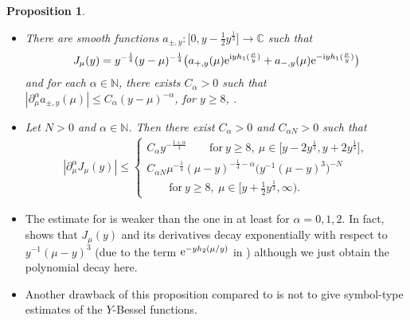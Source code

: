 \documentclass[pdftex]{sigma}
\numberwithin{equation}{section}
\newtheorem{Proposition}[Theorem]{Proposition}
 { \theoremstyle{definition}
\newtheorem{Definition}[Theorem]{Definition}
\newtheorem{Note}[Theorem]{Note}
\newtheorem{Example}[Theorem]{Example}
\newtheorem{Remark}[Theorem]{Remark} }
\def\a{\alpha}
\def\m{\mu}
\def\pa{\partial}
\begin{document}
\begin{Proposition}\label{Besselasymp}\quad
\begin{itemize}\itemsep=0pt
\item[$(i)$] There are smooth functions $a_{\pm,y}\colon \bigl[0,y-\frac{1}{2}y^{\frac{1}{3}}\bigr]\to \mathbb{C}$ such that
\begin{align*}
J_{\m}(y)=y^{-\frac{1}{4}}(y-\m)^{-\frac{1}{4}}\bigl(a_{+,y}(\m){\rm e}^{{\rm i}yh_1(\frac{\m}{y})}+a_{-,y}(\m){\rm e}^{-{\rm i}yh_1(\frac{\m}{y})} \bigr)
\end{align*}
and for each $\a\in\mathbb{N}$, there exists $C_{\a}>0$ such that
$
|\pa_{\m}^{\a}a_{\pm,y}(\m)|\leq C_{\a}(y-\m)^{-\a}$, for $ y\geq 8$, \smash{$ \m\in \bigl[0,y-\frac{1}{2}y^{\frac{1}{3}}\bigr]$}.
\item[$(ii)$] Let $N>0$ and $\a\in\mathbb{N}$. Then there exist $C_{\a}>0$ and $C_{\a N}>0$ such that
\begin{align*}
|\pa_{\m}^{\a}J_{\m}(y)|\leq \begin{cases}C_{\a}y^{-\frac{1+\a}{3}} \qquad \text{for}\  y\geq 8,\  \m\in \bigl[y-2y^{\frac{1}{3}},y+2y^{\frac{1}{3}}\bigr],\\
C_{\a N}\m^{-\frac{1}{4}}(\m-y)^{-\frac{1}{4}-\a} \bigl(y^{-1}(\m-y)^3 \bigr)^{-N} \\
\qquad \text{for}\  y\geq 8,\  \m\in \bigl[y+\frac{1}{2}y^{\frac{1}{3}},\infty\bigr).
\end{cases}
\end{align*}
\end{itemize}
\end{Proposition}

\begin{Remark}\quad
\begin{itemize}\itemsep=0pt
\item[(1)] The estimate for \smash{$\m\in \bigl[y+\frac{1}{2}y^{\frac{1}{3}},\infty\bigr)$} is weaker than the one in \cite[Theorem 9.1]{IJ} at least for $\a=0,1,2$. In fact, \cite[Theorem 9.1]{IJ} shows that $J_{\m}(y)$ and its derivatives decay exponentially with respect to $y^{-1}(\m-y)^3$ (due to the term ${\rm e}^{-yh_2(\m/y)}$ in \cite{IJ}) although we just obtain the polynomial decay here.

\item[(2)] Another drawback of this proposition compared to \cite[Theorem 9.1]{IJ} is not to give symbol-type estimates of the $Y$-Bessel functions.
\end{itemize}
\end{Remark}
\end{document}

